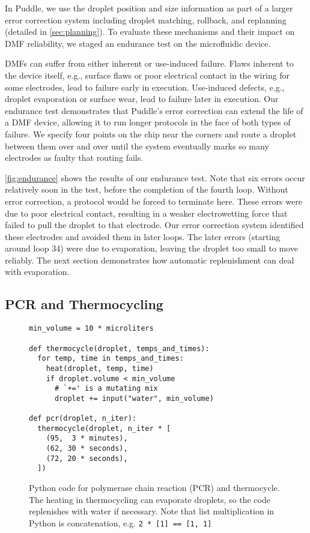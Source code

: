 \documentclass{jpaper}
\begin{document}
In Puddle, we use the droplet position and size information as part of a larger error correction system including droplet matching, rollback, and replanning (detailed in \autoref{sec:planning}).
To evaluate these mechanisms and their impact on DMF reliability, we staged an endurance test on the microfluidic device.

DMFs can suffer from either inherent or use-induced failure.
Flaws inherent to the device itself, e.g., surface flaws or poor electrical contact in the wiring for some electrodes, lead to failure early in execution.
Use-induced defects, e.g., droplet evaporation or surface wear, lead to failure later in execution.
Our endurance test demonstrates that Puddle's error correction can extend the life of a DMF device, allowing it to run longer protocols in the face of both types of failure.
We specify four points on the chip near the corners and route a droplet between them over and over until the system eventually marks so many electrodes as faulty that routing fails.

\autoref{fig:endurance} shows the results of our endurance test.
Note that six errors occur relatively soon in the test, before the completion of the fourth loop.
Without error correction, a protocol would be forced to terminate here.
These errors were due to poor electrical contact, resulting in a weaker electrowetting force that failed to pull the droplet to that electrode.
Our error correction system identified these electrodes and avoided them in later loops.
The later errors (starting around loop 34) were due to evaporation, leaving the droplet too small to move reliably.
The next section demonstrates how automatic replenishment can deal with evaporation.

\subsection{PCR and Thermocycling}
\label{sec:thermocycle}

\begin{figure}
  \centering
\begin{lstlisting}[basicstyle=\footnotesize\ttfamily]
min_volume = 10 * microliters

def thermocycle(droplet, temps_and_times):
  for temp, time in temps_and_times:
    heat(droplet, temp, time)
    if droplet.volume < min_volume
      # `+=' is a mutating mix
      droplet += input("water", min_volume)

def pcr(droplet, n_iter):
  thermocycle(droplet, n_iter * [
    (95,  3 * minutes),
    (62, 30 * seconds),
    (72, 20 * seconds),
  ])
\end{lstlisting}
  \caption{
    Python code for polymerase chain reaction (PCR) and thermocycle.
    The heating in thermocycling can evaporate droplets, so the code replenishes with water if necessary.
    Note that list multiplication in Python is concatenation, e.g. \lstinline{2 * [1] == [1, 1]}
  }
  \label{fig:thermocycle-code}
\end{figure}
\end{document}
